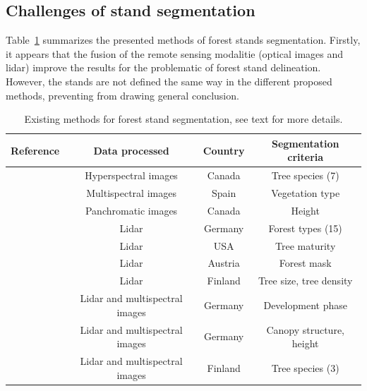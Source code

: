 \subsection{Challenges of stand segmentation}
Table~\ref{table:methods} summarizes the presented methods of forest stands segmentation. Firstly, it appears that the fusion of the remote sensing modalitie (optical images and lidar) improve the results for the problematic of forest stand delineation. However, the stands are not defined the same way in the different proposed methods, preventing from drawing general conclusion.
\begin{table}
\begin{center}
\begin{tabular}{|l|c|c|c|}
\hline
\textbf{Reference} & \textbf{Data processed} & \textbf{Country} & \textbf{Segmentation criteria} \\
\hline
\cite{leckie2003stand} & Hyperspectral images & Canada & Tree species (7) \\
\hline
\cite{hernando2012spatial} & Multispectral images & Spain & Vegetation type \\
\hline
\cite{Mora20102474} & Panchromatic images & Canada & Height \\
\hline
\cite{koch2009airborne} & Lidar & Germany & Forest types (15) \\
\hline
\cite{sullivan2009object} & Lidar & USA & Tree maturity \\
\hline
\cite{eysn2012forest} & Lidar &  Austria & Forest mask \\
\hline
\cite{wu2014data} & Lidar & Finland & Tree size, tree density \\
\hline
\cite{tiede2004object} & Lidar and multispectral images & Germany & Development phase \\
\hline
\cite{diedershagen2004automatic} & Lidar and multispectral images & Germany & Canopy structure, height \\
\hline
\cite{leppanen2008automatic} & Lidar and multispectral images & Finland & Tree species (3) \\
\hline
\end{tabular}
\caption{Existing methods for forest stand segmentation, see text for more details.}
\label{table:methods}
\end{center}
\end{table}

